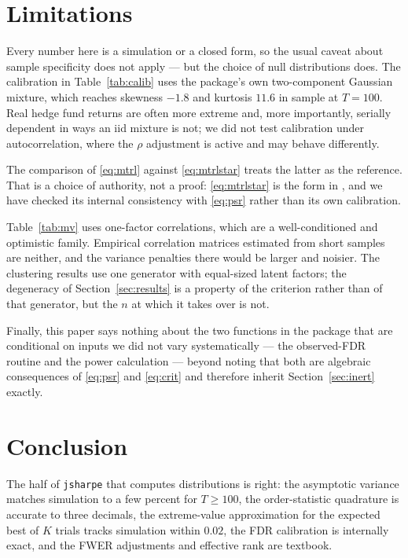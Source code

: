 \documentclass[11pt,a4paper]{article}
\newcommand{\code}[1]{\texttt{#1}}
\begin{document}
\section{Limitations}

Every number here is a simulation or a closed form, so the usual caveat about
sample specificity does not apply --- but the choice of null distributions
does. The calibration in Table~\ref{tab:calib} uses the package's own
two-component Gaussian mixture, which reaches skewness $-1.8$ and kurtosis
$11.6$ in sample at $T = 100$. Real hedge fund returns are often more extreme
and, more importantly, serially dependent in ways an iid mixture is not; we did
not test calibration under autocorrelation, where the $\rho$ adjustment is
active and may behave differently.

The comparison of \eqref{eq:mtrl} against \eqref{eq:mtrlstar} treats the latter
as the reference. That is a choice of authority, not a proof: \eqref{eq:mtrlstar}
is the form in \citet{bailey2012}, and we have checked its internal consistency
with \eqref{eq:psr} rather than its own calibration.

Table~\ref{tab:mv} uses one-factor correlations, which are a well-conditioned
and optimistic family. Empirical correlation matrices estimated from short
samples are neither, and the variance penalties there would be larger and
noisier. The clustering results use one generator with equal-sized latent
factors; the degeneracy of Section~\ref{sec:results} is a property of the
criterion rather than of that generator, but the $n$ at which it takes over is
not.

Finally, this paper says nothing about the two functions in the package that
are conditional on inputs we did not vary systematically --- the observed-FDR
routine and the power calculation --- beyond noting that both are algebraic
consequences of \eqref{eq:psr} and \eqref{eq:crit} and therefore inherit
Section~\ref{sec:inert} exactly.

\section{Conclusion}

The half of \code{jsharpe} that computes distributions is right: the
asymptotic variance matches simulation to a few percent for $T \geq 100$, the
order-statistic quadrature is accurate to three decimals, the extreme-value
approximation for the expected best of $K$ trials tracks simulation within
$0.02$, the FDR calibration is internally exact, and the FWER adjustments and
effective rank are textbook.
\end{document}
